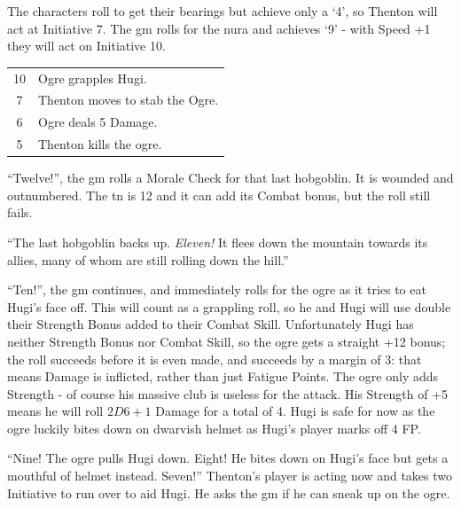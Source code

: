 \documentclass[titlepage,a4paper,openany]{book}
\begin{document}
\begin{multicols}{2}
{\begin{exampletext}
		The characters roll to get their bearings but achieve only a `4', so Thenton will act at Initiative 7. The \gls{gm} rolls for the nura and achieves `9' - with Speed +1 they will act on Initiative 10.

		\vspace{1em}

		\begin{tabularx}{.3\textwidth}{c|X}
				\setcounter{enc}{12}

				10 & Ogre grapples Hugi. \\

				7 & Thenton moves to stab the Ogre. \\

				6 & Ogre deals 5 Damage. \\

				5 & Thenton kills the ogre. \\


		\end{tabularx}

		\vspace{1em}

		``Twelve!'', the \gls{gm} rolls a Morale Check for that last hobgoblin. It is wounded and outnumbered. The \gls{tn} is 12 and it can add its Combat bonus, but the roll still fails.

		``The last hobgoblin backs up. \textit{Eleven!} It flees down the mountain towards its allies, many of whom are still rolling down the hill.''

		``Ten!'', the \gls{gm} continues, and immediately rolls for the ogre as it tries to eat Hugi's face off. This will count as a grappling roll, so he and Hugi will use double their Strength Bonus added to their Combat Skill. Unfortunately Hugi has neither Strength Bonus nor Combat Skill, so the ogre gets a straight +12 bonus; the roll succeeds before it is even made, and succeeds by a margin of 3: that means Damage is inflicted, rather than just Fatigue Points. The ogre only adds Strength - of course his massive club is useless for the attack. His Strength of +5 means he will roll $2D6+1$ Damage for a total of 4. Hugi is safe for now as the ogre luckily bites down on dwarvish helmet as Hugi's player marks off 4 FP.

		``Nine! The ogre pulls Hugi down. Eight! He bites down on Hugi's face but gets a mouthful of helmet instead. Seven!''
		Thenton's player is acting now and takes two Initiative to run over to aid Hugi. He asks the \gls{gm} if he can sneak up on the ogre.


\end{exampletext}}
\end{multicols}
\end{document}
